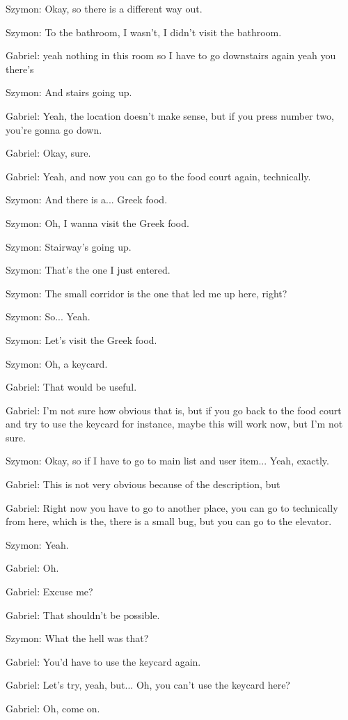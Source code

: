Szymon: Okay, so there is a different way out.

Szymon: To the bathroom, I wasn't, I didn't visit the bathroom.

Gabriel: yeah nothing in this room so I have to go downstairs again yeah you there's

Szymon: And stairs going up.

Gabriel: Yeah, the location doesn't make sense, but if you press number two, you're gonna go down.

Gabriel: Okay, sure.

Gabriel: Yeah, and now you can go to the food court again, technically.

Szymon: And there is a... Greek food.

Szymon: Oh, I wanna visit the Greek food.

Szymon: Stairway's going up.

Szymon: That's the one I just entered.

Szymon: The small corridor is the one that led me up here, right?

Szymon: So... Yeah.

Szymon: Let's visit the Greek food.

Szymon: Oh, a keycard.

Gabriel: That would be useful.

Gabriel: I'm not sure how obvious that is, but if you go back to the food court and try to use the keycard for instance, maybe this will work now, but I'm not sure.

Szymon: Okay, so if I have to go to main list and user item... Yeah, exactly.

Gabriel: This is not very obvious because of the description, but

Gabriel: Right now you have to go to another place, you can go to technically from here, which is the, there is a small bug, but you can go to the elevator.

Szymon: Yeah.

Gabriel: Oh.

Gabriel: Excuse me?

Gabriel: That shouldn't be possible.

Szymon: What the hell was that?

Gabriel: You'd have to use the keycard again.

Gabriel: Let's try, yeah, but... Oh, you can't use the keycard here?

Gabriel: Oh, come on.

